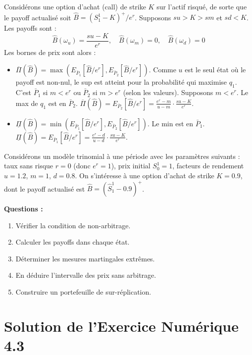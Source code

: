 \begin{exemple}
Considérons une option d'achat (call) de strike $K$ sur l'actif risqué, de sorte que le payoff actualisé soit $\hat{B} = (S_1^1 - K)^+/e^r$. Supposons $su > K > sm$ et $sd < K$. Les payoffs sont :
\[
\hat{B}(\omega_u) = \frac{su-K}{e^r}, \quad \hat{B}(\omega_m) = 0, \quad \hat{B}(\omega_d) = 0
\]
Les bornes de prix sont alors :
\begin{itemize}
    \item $\overline{\Pi}(\hat{B}) = \max(E_{\bar{P}_1}[\hat{B}/e^r], E_{\bar{P}_2}[\hat{B}/e^r])$.
    Comme $u$ est le seul état où le payoff est non-nul, le sup est atteint pour la probabilité qui maximise $q_1$. C'est $\bar{P}_1$ si $m < e^r$ ou $\bar{P}_2$ si $m > e^r$ (selon les valeurs).
    Supposons $m < e^r$. Le max de $q_1$ est en $\bar{P}_2$.
    $\overline{\Pi}(\hat{B}) = E_{\bar{P}_2}[\hat{B}/e^r] = \frac{e^r-m}{u-m} \cdot \frac{su-K}{e^r}$.
    \item $\underline{\Pi}(\hat{B}) = \min(E_{\bar{P}_1}[\hat{B}/e^r], E_{\bar{P}_2}[\hat{B}/e^r])$.
    Le min est en $\bar{P}_1$.
    $\underline{\Pi}(\hat{B}) = E_{\bar{P}_1}[\hat{B}/e^r] = \frac{e^r-d}{u-d} \cdot \frac{su-K}{e^r}$.
\end{itemize}
\end{exemple}

\begin{exemple}
Considérons un modèle trinomial à une période avec les paramètres suivants : taux sans risque $r=0$ (donc $e^r = 1$), prix initial $S_0^1 = 1$, facteurs de rendement $u=1.2$, $m=1$, $d=0.8$. On s'intéresse à une option d'achat de strike $K = 0.9$, dont le payoff actualisé est $\hat{B} = (\hat{S}^1_1 - 0.9)^+$.

\textbf{Questions :}
\begin{enumerate}
    \item Vérifier la condition de non-arbitrage.
    \item Calculer les payoffs dans chaque état.
    \item Déterminer les mesures martingales extrêmes.
    \item En déduire l'intervalle des prix sans arbitrage.
    \item Construire un portefeuille de sur-réplication.
\end{enumerate}
\end{exemple}

\section*{Solution de l'Exercice Numérique 4.3}

